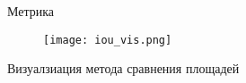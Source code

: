 
\begin{frame}{Метрика}
\begin{figure}
\centering
\texttt{[image: iou\_vis.png]}
\end{figure}
    Визуалзиация метода сравнения площадей
\end{frame}